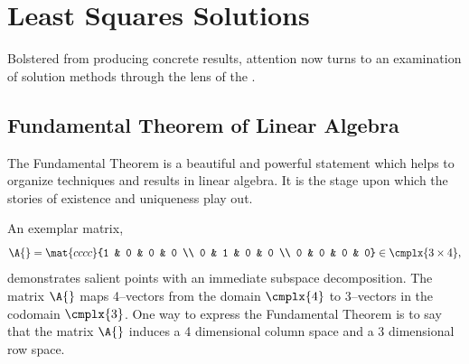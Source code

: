 \chapter{Least Squares Solutions}

Bolstered from producing concrete results, attention now turns to an examination of solution methods through the lens of the \ft.

\section{Fundamental Theorem of Linear Algebra}  %
The Fundamental Theorem is a beautiful and powerful statement which helps to organize techniques and results in linear algebra. It is the stage upon which the stories of existence and uniqueness play out.

An exemplar matrix,
  \begin{equation*}   %
      \A{} = \mat{cccc}{1 & 0 & 0 & 0 \\ 0 & 1 & 0 & 0 \\ 0 & 0 & 0 & 0} \in \cmplx{3\times 4},
  \end{equation*}
demonstrates salient points with an immediate subspace decomposition. The matrix $\A{}$ maps 4--vectors from the domain $\cmplx{4}$ to 3--vectors in the codomain $\cmplx{3}$. One way to express the Fundamental Theorem is to say that the matrix $\A{}$ induces a 4 dimensional column space and a 3 dimensional row space. 

